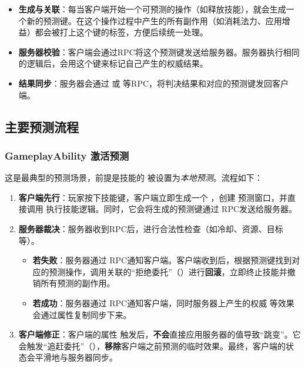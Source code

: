 \documentclass[10pt,CJKmath]{ctexart}
\begin{document}
	\begin{itemize}
		\item \textbf{生成与关联}：每当客户端开始一个可预测的操作（如释放技能），就会生成一个新的预测键。在这个操作过程中产生的所有副作用（如消耗法力、应用增益）都会被打上这个键的标签，方便后续统一处理。
		\item \textbf{服务器校验}：客户端会通过RPC将这个预测键发送给服务器。服务器执行相同的逻辑后，会用这个键来标记自己产生的权威结果。
		\item \textbf{结果同步}：服务器会通过  或  等RPC，将判决结果和对应的预测键发回客户端。
	\end{itemize}
	
	\subsection{主要预测流程}
	
	\subsubsection{GameplayAbility 激活预测}
	这是最典型的预测场景，前提是技能的  被设置为\emph{本地预测}。流程如下：
	
	\begin{enumerate}
		\item \textbf{客户端先行}：玩家按下技能键，客户端立即生成一个 ，创建  预测窗口，并直接调用  执行技能逻辑。同时，它会将生成的预测键通过  RPC发送给服务器。
		\item \textbf{服务器裁决}：服务器收到RPC后，进行合法性检查（如冷却、资源、目标等）。
		\begin{itemize}
			\item \textbf{若失败}：服务器通过  RPC通知客户端。客户端收到后，根据预测键找到对应的预测操作，调用关联的“拒绝委托”（）进行\textbf{回滚}，立即终止技能并撤销所有预测的副作用。
			\item \textbf{若成功}：服务器通过  RPC通知客户端，同时服务器上产生的权威  等效果会通过属性复制同步下来。
		\end{itemize}
		\item \textbf{客户端修正}：客户端的属性  触发后，\textbf{不会}直接应用服务器的值导致“跳变”。它会触发“追赶委托”（），\textbf{移除}客户端之前预测的临时效果。最终，客户端的状态会平滑地与服务器同步。
	\end{enumerate}
	
\end{document}
